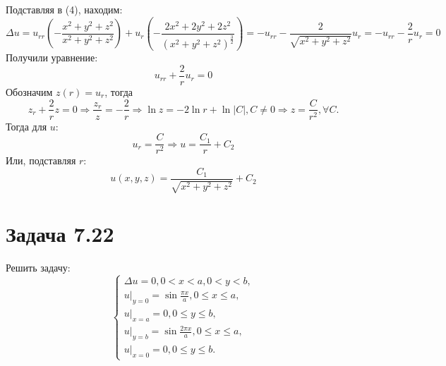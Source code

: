\documentclass[11pt]{article}
\begin{document}
Подставляя в (4), находим:
\begin{equation*}
\Delta u = u_{rr}\left(-\frac{x^2 + y^2 + z^2}{x^2 + y^2 + z^2}\right) +
u_r\left(-\frac{2x^2 + 2y^2 + 2z^2}{(x^2 + y^2 + z^2)^{\frac32}}\right) = 
-u_{rr} - \frac2{\sqrt{x^2 + y^2 + z^2}}u_r = -u_{rr} - \frac2ru_r = 0
\end{equation*}
Получили уравнение:
\begin{equation}
u_{rr} + \frac2ru_r = 0
\end{equation}
Обозначим $z(r) = u_r$, тогда
\begin{equation*}
z_r + \frac2rz = 0 \Rightarrow \frac{z_r}z = -\frac2r \Rightarrow \ln z = -2\ln r + \ln |C|, C \neq 0
\Rightarrow z = \frac{C}{r^2}, \forall C.
\end{equation*}
Тогда для $u$:
\begin{equation*}
u_r = \frac{C}{r^2} \Rightarrow u = \frac{C_1}r + C_2
\end{equation*}
Или, подставляя $r$:
\begin{equation}
u(x, y, z) = \frac{C_1}{\sqrt{x^2 + y^2 + z^2}} + C_2
\end{equation}
\section{Задача 7.22}
\label{sec:org5378a23}
Решить задачу:
\begin{equation}
\begin{cases}
\Delta u = 0, 0 < x < a, 0 < y < b, \\
u|_{y = 0} = \sin\frac{\pi x}a, 0 \leq x \leq a, \\
u|_{x = a} = 0, 0 \leq y \leq b, \\
u|_{y = b} = \sin\frac{2\pi x}a, 0 \leq x \leq a, \\
u|_{x = 0} = 0, 0 \leq y \leq b.
\end{cases}
\end{equation}
\end{document}
